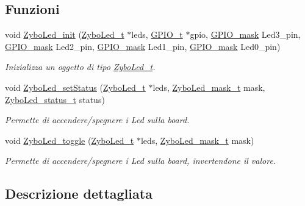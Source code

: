 \subsection*{Funzioni}
\begin{DoxyCompactItemize}
\item 
void \hyperlink{group___led_ga51b030897fde9b6378d083b8d711008e}{Zybo\+Led\+\_\+init} (\hyperlink{struct_zybo_led__t}{Zybo\+Led\+\_\+t} $\ast$leds, \hyperlink{struct_g_p_i_o__t}{G\+P\+I\+O\+\_\+t} $\ast$gpio, \hyperlink{group___g_p_i_o_ga6d5aef8a8a54ee2f602d47252ff66595}{G\+P\+I\+O\+\_\+mask} Led3\+\_\+pin, \hyperlink{group___g_p_i_o_ga6d5aef8a8a54ee2f602d47252ff66595}{G\+P\+I\+O\+\_\+mask} Led2\+\_\+pin, \hyperlink{group___g_p_i_o_ga6d5aef8a8a54ee2f602d47252ff66595}{G\+P\+I\+O\+\_\+mask} Led1\+\_\+pin, \hyperlink{group___g_p_i_o_ga6d5aef8a8a54ee2f602d47252ff66595}{G\+P\+I\+O\+\_\+mask} Led0\+\_\+pin)
\begin{DoxyCompactList}\small\item\em Inizializza un oggetto di tipo \hyperlink{struct_zybo_led__t}{Zybo\+Led\+\_\+t}. \end{DoxyCompactList}\item 
void \hyperlink{group___led_gacf5c2b0328c4bdf2d796397fc4510c69}{Zybo\+Led\+\_\+set\+Status} (\hyperlink{struct_zybo_led__t}{Zybo\+Led\+\_\+t} $\ast$leds, \hyperlink{group___led_gad11701cccac394f7e1f90de8f85695f3}{Zybo\+Led\+\_\+mask\+\_\+t} mask, \hyperlink{group___led_ga3dcb274f22e577705c49944b8d1f4b12}{Zybo\+Led\+\_\+status\+\_\+t} status)
\begin{DoxyCompactList}\small\item\em Permette di accendere/spegnere i Led sulla board. \end{DoxyCompactList}\item 
void \hyperlink{group___led_ga20ddd78a98b4c0123c5b964aa0a59046}{Zybo\+Led\+\_\+toggle} (\hyperlink{struct_zybo_led__t}{Zybo\+Led\+\_\+t} $\ast$leds, \hyperlink{group___led_gad11701cccac394f7e1f90de8f85695f3}{Zybo\+Led\+\_\+mask\+\_\+t} mask)
\begin{DoxyCompactList}\small\item\em Permette di accendere/spegnere i Led sulla board, invertendone il valore. \end{DoxyCompactList}\end{DoxyCompactItemize}


\subsection{Descrizione dettagliata}


